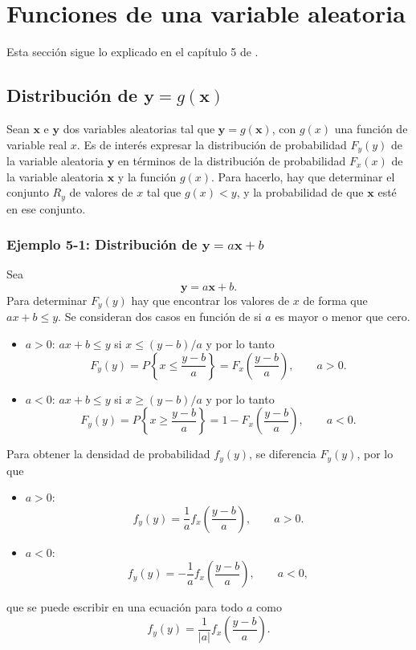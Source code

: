 \documentclass[a4paper]{report}
\newcommand{\x}{\mathbf{x}}
\newcommand{\y}{\mathbf{y}}
\begin{document}
\chapter{Funciones de una variable aleatoria}

Esta sección sigue lo explicado en el capítulo 5 de \cite{papoulis2002probability}.

\section{\texorpdfstring{Distribución de \(\y=g(\x)\)}{}}

Sean \(\x\) e \(\y\) dos variables aleatorias tal que \(\y=g(\x)\), con \(g(x)\) una función de variable real \(x\). Es de interés expresar la distribución de probabilidad \(F_y(y)\) de la variable aleatoria \(\y\) en términos de la distribución de probabilidad \(F_x(x)\) de la variable aleatoria \(\x\) y la función \(g(x)\). Para hacerlo, hay que determinar el conjunto \(R_y\) de valores de \(x\) tal que \(g(x)<y\), y la probabilidad de que \(\x\) esté en ese conjunto.

\subsection{\texorpdfstring{Ejemplo 5-1: Distribución de \(\y=a\x+b\)}{}}\label{sec:y_equals_ax_plus_b_distribution}

Sea
\[
 \y=a\x+b.
\]
Para determinar \(F_y(y)\) hay que encontrar los valores de \(x\) de forma que \(ax+b\leq y\). Se consideran dos casos en función de si \(a\) es mayor o menor que cero.
\begin{itemize}
 \item \(a>0\): \(ax+b\leq y\) si \(x\leq(y-b)/a\) y por lo tanto
 \[
  F_y(y)=P\left\{x\leq\frac{y-b}{a}\right\}=F_x\left(\frac{y-b}{a}\right), \qquad a>0.
 \]
 \item \(a<0\): \(ax+b\leq y\) si \(x\geq(y-b)/a\) y por lo tanto
 \[
  F_y(y)=P\left\{x\geq\frac{y-b}{a}\right\}=1-F_x\left(\frac{y-b}{a}\right), \qquad a<0.
 \]
\end{itemize}
Para obtener la densidad de probabilidad \(f_y(y)\), se diferencia \(F_y(y)\), por lo que
\begin{itemize}
 \item \(a>0\): 
 \[
  f_y(y)=\frac{1}{a}f_x\left(\frac{y-b}{a}\right), \qquad a>0.
 \]
 \item \(a<0\): 
 \[
  f_y(y)=-\frac{1}{a}f_x\left(\frac{y-b}{a}\right), \qquad a<0,
 \]
\end{itemize}
que se puede escribir en una ecuación para todo \(a\) como
\begin{equation}\label{eq:y_equals_ax_plus_b_density}
 f_y(y)=\frac{1}{|a|}f_x\left(\frac{y-b}{a}\right).
\end{equation}
\end{document}
